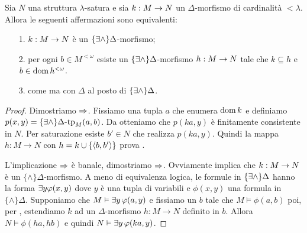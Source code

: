 % 

\begin{lemma}\label{lem_EDelta_estensione}
Sia $N$ una struttura $\lambda$-satura e sia $k:M\rightarrow N$ un $\Delta$-morfismo di cardinalit\`a $<\lambda$. Allora le seguenti affermazioni sono equivalenti:
\begin{itemize}
\item[1.] $k:M\rightarrow N$ \`e un $\{\exists\wedge\}\Delta$-morfismo;
\item[2.] per ogni $b\in M^{<\omega}$ esiste un $\{\exists\wedge\}\Delta$-morfismo $h:M\rightarrow N$ tale che $k\subseteq h$ e $b\in\mathop{\rm dom} h^{<\omega}$.
\item[3.] come   ma con $\Delta$ al posto di $\{\exists\wedge\}\Delta$.
\end{itemize}
\end{lemma}

\begin{proof}
Dimostriamo $\Rightarrow$. Fissiamo una tupla $a$ che enumera $\mathop{\rm dom} k$ e definiamo $p(x,y)=\{\exists\wedge\}\Delta\mbox{-}\textrm{tp}_M (a,b)$. Da  otteniamo che $p(ka,y)$ \`e finitamente consistente in $N$. Per saturazione esiste $b'\in N$ che realizza $p(ka,y)$. Quindi la mappa $h:M\to N$ con $h=k\cup\{\langle b,b'\rangle\}$ prova .

L'implicazione $\Rightarrow$ \`e banale, dimostriamo $\Rightarrow$. Ovviamente  implica che $k:M\rightarrow N$ \`e un $\{\wedge\}\Delta$-morfismo. A meno di equivalenza logica, le formule in $\{\exists\wedge\}\Delta$ hanno la forma  $\exists y \varphi (x,y)$ dove $y$ \`e una tupla di variabili e $\phi(x,y)$ una formula in $\{\wedge\}\Delta$. Supponiamo che $M\vDash\exists y\,\varphi(a,y)$ e fissiamo un $b$ tale che $M\models\phi(a,b)$ poi, per , estendiamo $k$ ad un $\Delta$-morfismo $h:M\to N$ definito in $b$. Allora $N\models\phi(ha,hb)$ e quindi $N\vDash\exists y\,\varphi(ka,y)$.
\end{proof}


